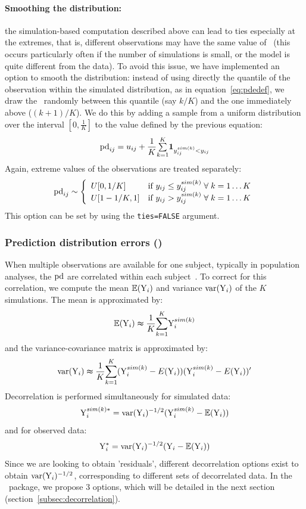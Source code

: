 \paragraph{Smoothing the distribution:} the simulation-based computation described above can lead to ties 
especially at the extremes, that is, different observations may have the same value of \pd~(this occurs 
particularly often if the number of simulations is small, or the model is quite different from the data). To avoid 
this issue, we have implemented an option to smooth the distribution: instead of using directly the quantile of the 
observation within the simulated distribution, as in equation~\ref{eq:pdedef}, we draw the \pd~randomly between 
this quantile (say $k/K$) and the one immediately above ($(k+1)/K$). We do this by adding a sample from a uniform 
distribution over the interval $\left[0,\frac{1}{K}\right]$ to the value defined by the previous equation: 
\begin{equation} 
{\rm pd}_{ij} = u_{ij} + \frac{1}{K}{\textstyle \overset{K}{\underset{k=1}{\sum}}\boldsymbol{1}_{y_{ij}^{sim(k)}<y_{ij}}} 
\end{equation} 
Again, extreme values of 
the observations are treated separately: 
\begin{equation*} 
{\rm pd}_{ij} \sim \left\{ 
\begin{array}{l r} 
U[0,1/K] &  \text{if } y_{ij} \leq y_{ij}^{sim(k)} \; \forall \; k=1\ldots K \\ 
U[1-1/K,1] & \text{if } y_{ij} >  y_{ij}^{sim(k)} \; \forall \; k=1\ldots K \\ 
\end{array} \right. 
\end{equation*} 
This option can be set by using the \texttt{ties=FALSE} argument.

\subsubsection{Prediction distribution errors (\pde)} 

\hskip 18pt When multiple observations are available for one subject, typically in population analyses, the ${\rm pd}$ 
are correlated within each subject~\cite{MentrePDE}. To correct for this correlation, we compute the mean 
$\mathbb{E}({\rm Y}_i)$ and variance $\hbox{var}({\rm Y}_i)$ of the $K$ simulations. The mean is approximated by: 
$$\mathbb{E}({\rm Y}_{i})\thickapprox\frac{1}{K}\overset{K}{\underset{k=1}{\sum}}{\rm Y}_{i}^{sim(k)}$$ and the 
variance-covariance matrix is approximated by: $$\hbox{var}({\rm Y}_{i})\thickapprox 
\frac{1}{K}\overset{K}{\underset{k=1}{\sum}}({\rm Y}_{i}^{sim(k)}-E({\rm Y}_{i}))({\rm Y}_{i}^{sim(k)}-E({\rm Y}_{i}))'$$ Decorrelation 
is performed simultaneously for simulated data: $$ {\rm Y}_{i}^{sim(k)*}= \hbox{var}({\rm Y}_i)^{-1/2} 
({\rm Y}_{i}^{sim(k)}-\mathbb{E}({\rm Y}_i))$$ and for observed data: $$ {\rm Y}_{i}^*= \hbox{var}({\rm Y}_i)^{-1/2} 
({\rm Y}_{i}-\mathbb{E}({\rm Y}_i))$$ Since we are looking to obtain 'residuals', different decorrelation options exist to 
obtain $\hbox{var}({\rm Y}_i)^{-1/2}$, corresponding to different sets of decorrelated data. In the \npde~package, we propose 
3 options, which will be detailed in the next section (section~\ref{subsec:decorrelation}).

